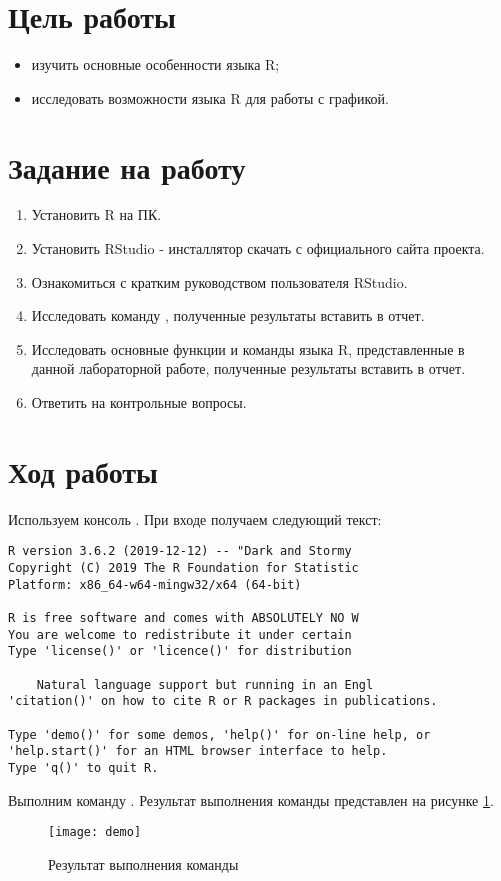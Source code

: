 \documentclass[a4paper,14pt]{extarticle}
\begin{document}


\section{Цель работы}
\begin{itemize}
    \item изучить основные особенности языка R;
    \item исследовать возможности языка R для работы с графикой.
\end{itemize}

\section{Задание на работу}
\begin{enumerate}
    \item Установить R на ПК.
    \item Установить RStudio - инсталлятор скачать с официального сайта проекта.
    \item Ознакомиться с кратким руководством пользователя RStudio.
    \item Исследовать команду , полученные результаты вставить в отчет.
    \item Исследовать основные функции и команды языка R, представленные в данной
          лабораторной работе, полученные результаты вставить в отчет.
    \item Ответить на контрольные вопросы.
\end{enumerate}

\section{Ход работы}
Используем консоль . При входе получаем следующий текст:

\begin{lstlisting}
R version 3.6.2 (2019-12-12) -- "Dark and Stormy 
Copyright (C) 2019 The R Foundation for Statistic
Platform: x86_64-w64-mingw32/x64 (64-bit)

R is free software and comes with ABSOLUTELY NO W
You are welcome to redistribute it under certain 
Type 'license()' or 'licence()' for distribution 

    Natural language support but running in an Engl
'citation()' on how to cite R or R packages in publications.

Type 'demo()' for some demos, 'help()' for on-line help, or
'help.start()' for an HTML browser interface to help.
Type 'q()' to quit R.
\end{lstlisting}

Выполним команду . Результат выполнения команды представлен
на рисунке \ref{fig:demo}.

\begin{figure}[H]
    \centering
    \texttt{[image: demo]}
    \caption{Результат выполнения команды }
    \label{fig:demo}
\end{figure}
\end{document}

